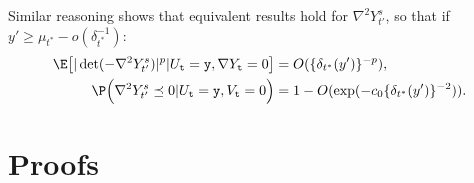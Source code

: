 \documentclass{article}
\begin{document}
	Similar reasoning shows that equivalent results hold for $\nabla^2 Y_{t'}^s$, so that if $y' \geq \mu_{t^*} - o(\delta_{t^*}^{-1})$:
	\begin{equation}
		\label{eqn:randomized-kac-rice-hessian-moments-2}
		\begin{aligned}
			\E\big[|\det(-\nabla^2 Y_{t'}^s)|^p|U_{{\tt t}} = {\tt y},\nabla Y_{{\tt t}} = 0\big] 
			& = 
			O(\{\delta_{t^*}(y')\}^{-p}),  \\
			\P\Big(\nabla^2 Y_{t'}^s \preceq  0|U_{{\tt t}} = {\tt y}, V_{{\tt t}} = 0\Big) 
			& = 
			1 - O(\exp(-c_0\{\delta_{t^*}(y')\}^{-2})).
		\end{aligned}
	\end{equation}
	
	\section{Proofs}
	
\end{document}
